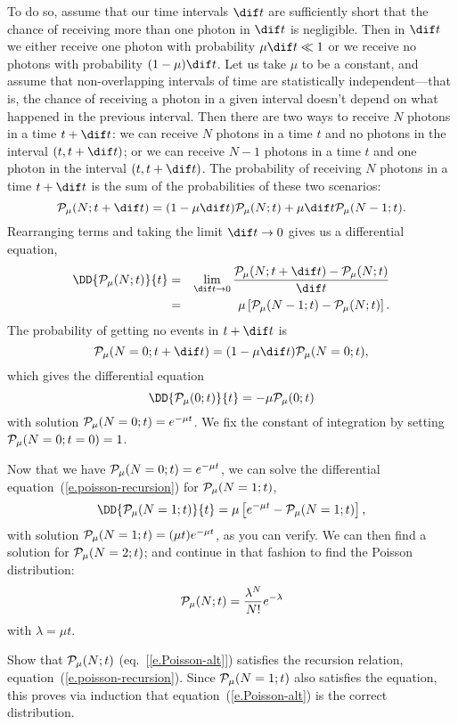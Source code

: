 To do so, assume that our time intervals $\dif t$ are sufficiently short that the chance of receiving more than one photon in $\dif t$ is negligible.  Then in $\dif t$ we either receive one photon with probability $\mu\dif t \ll 1$ or we receive no photons with probability $(1-\mu)\dif t$.  Let us take $\mu$ to be a constant, and assume that non-overlapping intervals of time are statistically independent---that is, the chance of receiving a photon in a given interval doesn't depend on what happened in the previous interval.  Then there are two ways to receive $N$ photons in a time $t+\dif t$: we can receive $N$ photons in a time $t$ and no photons in the interval $(t,t+\dif t)$; or we can receive $N-1$ photons in a time $t$ and one photon in the interval $(t,t+\dif t)$.  The probability of receiving $N$ photons in a time $t+\dif t$ is the sum of the probabilities of these two scenarios:
\[
	\prob_{\mu}(N;t+\dif t) = (1-\mu\dif t)\prob_{\mu}(N;t) + \mu\dif t \prob_{\mu}(N-1;t).
\]
Rearranging terms and taking the limit $\dif t \to 0$ gives us a differential equation,
\begin{eqnarray}
\DD{\prob_{\mu}(N;t)}{t} &=& \lim_{\dif t\to 0} \frac{\prob_{\mu}(N;t+\dif t)-\prob_{\mu}(N;t)}{\dif t} \nonumber\\
&=& \mu\left[\prob_{\mu}(N-1;t)-\prob_{\mu}(N;t)\right].
\label{e.poisson-recursion}
\end{eqnarray}
The probability of getting no events in $t+\dif t$ is
\[ \prob_{\mu}(N=0;t+\dif t) = (1-\mu\dif t)\prob_{\mu}(N=0;t), \]
which gives the differential equation
\[ \DD{\prob_{\mu}(0;t)}{t} = -\mu\prob_{\mu}(0;t) \]
with solution $\mathcal{P}_{\mu}(N=0;t) = e^{-\mu t}$.  We fix the constant of integration by setting $\mathcal{P}_{\mu}(N=0;t=0) = 1$.

Now that we have $\mathcal{P}_{\mu}(N=0;t) = e^{-\mu t}$, we can solve the differential equation~(\ref{e.poisson-recursion}) for $\mathcal{P}_{\mu}(N=1;t)$,
\[ \DD{\prob_{\mu}(N=1;t)}{t} = \mu\left[e^{-\mu t} - \prob_{\mu}(N=1;t)\right], \]
with solution $\mathcal{P}_{\mu}(N=1;t) = (\mu t)e^{-\mu t}$, as you can verify.  We can then find a solution for $\mathcal{P}_{\mu}(N=2;t)$; and continue in that fashion to find the Poisson distribution:
\begin{equation}\label{e.Poisson-alt}
	\mathcal{P}_{\mu}(N;t) = \frac{\lambda^{N}}{N!} e^{-\lambda}
\end{equation}
with $\lambda=\mu t$.

\begin{exercisebox}
Show that $\mathcal{P}_{\mu}(N;t)$ (eq.~[\ref{e.Poisson-alt}]) satisfies the recursion relation, equation~(\ref{e.poisson-recursion}). Since $\mathcal{P}_{\mu}(N=1;t)$ also satisfies the equation, this proves via induction that equation~(\ref{e.Poisson-alt}) is the correct distribution.
\end{exercisebox}

